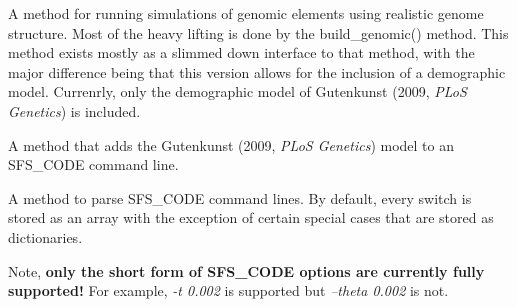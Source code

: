 \documentclass[letterpaper,10pt,english]{sphinxmanual}
\begin{document}
\begin{fulllineitems}
\begin{fulllineitems}
\end{fulllineitems}


\begin{fulllineitems}
\label{index:command.SFSCommand.genomic}
A method for running simulations of genomic elements using realistic
genome structure. Most of the heavy lifting is done by the 
build\_genomic() method.  This method exists mostly as a slimmed down
interface to that method, with the major difference being that this 
version allows for the inclusion of a demographic model. Currenrly,
only the demographic model of Gutenkunst (2009, \emph{PLoS Genetics}) is
included.

\end{fulllineitems}


\begin{fulllineitems}
\label{index:command.SFSCommand.gutenkunst}
A method that adds the Gutenkunst (2009, \emph{PLoS Genetics}) model to
an SFS\_CODE command line.

\end{fulllineitems}


\begin{fulllineitems}
\label{index:command.SFSCommand.parse_string}
A method to parse SFS\_CODE command lines.  By default, every switch
is stored as an array with the exception of certain special cases that
are stored as dictionaries.

Note, \textbf{only the short form of SFS\_CODE options are currently fully 
supported!}  For example, \emph{-t 0.002} is supported but \emph{--theta 0.002}
is not.

\end{fulllineitems}


\end{fulllineitems}
\end{document}
